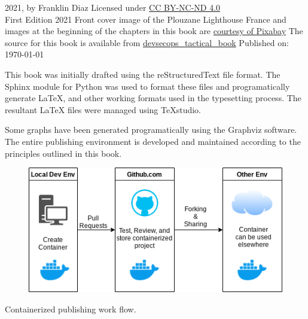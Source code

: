 \justify
\textcopyright{} 2021, by Franklin Diaz
\justify
Licensed under \href{https://creativecommons.org/licenses/by-nc-nd/4.0/}{CC BY-NC-ND 4.0}
\vspace{5mm}\\
First Edition 2021
\justify
Front cover image of the Plouzane Lighthouse France and images
at the beginning of the chapters in this book are
\href{https://pixabay.com/service/terms/#license}{courtesy of Pixabay}
\justify
The source for this book is available from {\href{https://github.com/thedevilsvoice/devsecops\_tactical\_book}{devsecops\_tactical\_book}}
\vspace{3mm}
Published on: \today

\justify
This book was initially drafted using the reStructuredText file format. 
The Sphinx module for Python was used to format these files and programatically
generate LaTeX, and other working formats used in the typesetting process. The
resultant LaTeX files were managed using TeXstudio.

Some graphs have been generated programatically using the Graphviz software. 
The entire publishing environment is developed and maintained according
to the principles outlined in this book.

\vspace{5mm}
    \centering
\vspace{0mm}
\begin{figure}[!htb]
	\centering
	\includegraphics[scale=0.75]{../images/workflow.png}
\end{figure}
\vspace{2mm}
Containerized publishing work flow.
